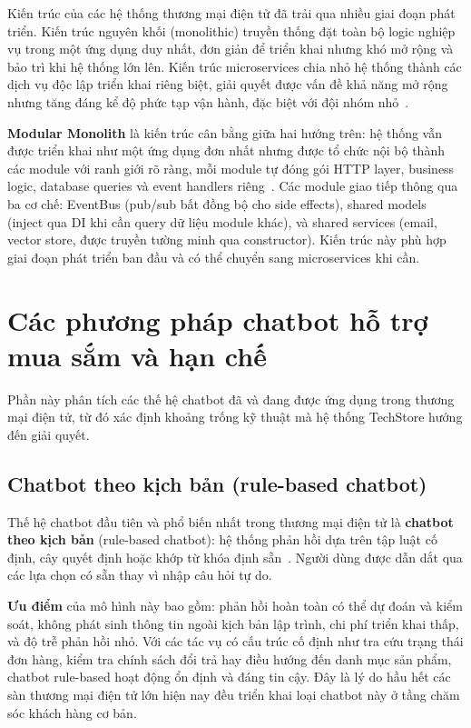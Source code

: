 Kiến trúc của các hệ thống thương mại điện tử đã trải qua nhiều giai đoạn phát triển. Kiến trúc nguyên khối (monolithic) truyền thống đặt toàn bộ logic nghiệp vụ trong một ứng dụng duy nhất, đơn giản để triển khai nhưng khó mở rộng và bảo trì khi hệ thống lớn lên. Kiến trúc microservices chia nhỏ hệ thống thành các dịch vụ độc lập triển khai riêng biệt, giải quyết được vấn đề khả năng mở rộng nhưng tăng đáng kể độ phức tạp vận hành, đặc biệt với đội nhóm nhỏ~\cite{newman2015building}.

\textbf{Modular Monolith} là kiến trúc cân bằng giữa hai hướng trên: hệ thống vẫn được triển khai như một ứng dụng đơn nhất nhưng được tổ chức nội bộ thành các module với ranh giới rõ ràng, mỗi module tự đóng gói HTTP layer, business logic, database queries và event handlers riêng~\cite{richter2020modular}. Các module giao tiếp thông qua ba cơ chế: EventBus (pub/sub bất đồng bộ cho side effects), shared models (inject qua DI khi cần query dữ liệu module khác), và shared services (email, vector store, được truyền tường minh qua constructor). Kiến trúc này phù hợp giai đoạn phát triển ban đầu và có thể chuyển sang microservices khi cần.

\section{Các phương pháp chatbot hỗ trợ mua sắm và hạn chế}
\label{sec:c2_chatbot_survey}

Phần này phân tích các thế hệ chatbot đã và đang được ứng dụng trong thương mại điện tử, từ đó xác định khoảng trống kỹ thuật mà hệ thống TechStore hướng đến giải quyết.

\subsection{Chatbot theo kịch bản (rule-based chatbot)}
\label{subsec:c2_rulebased}

Thế hệ chatbot đầu tiên và phổ biến nhất trong thương mại điện tử là \textbf{chatbot theo kịch bản} (rule-based chatbot): hệ thống phản hồi dựa trên tập luật cố định, cây quyết định hoặc khớp từ khóa định sẵn~\cite{adamopoulou2020chatbots}. Người dùng được dẫn dắt qua các lựa chọn có sẵn thay vì nhập câu hỏi tự do.

\textbf{Ưu điểm} của mô hình này bao gồm: phản hồi hoàn toàn có thể dự đoán và kiểm soát, không phát sinh thông tin ngoài kịch bản lập trình, chi phí triển khai thấp, và độ trễ phản hồi nhỏ. Với các tác vụ có cấu trúc cố định như tra cứu trạng thái đơn hàng, kiểm tra chính sách đổi trả hay điều hướng đến danh mục sản phẩm, chatbot rule-based hoạt động ổn định và đáng tin cậy. Đây là lý do hầu hết các sàn thương mại điện tử lớn hiện nay đều triển khai loại chatbot này ở tầng chăm sóc khách hàng cơ bản.

